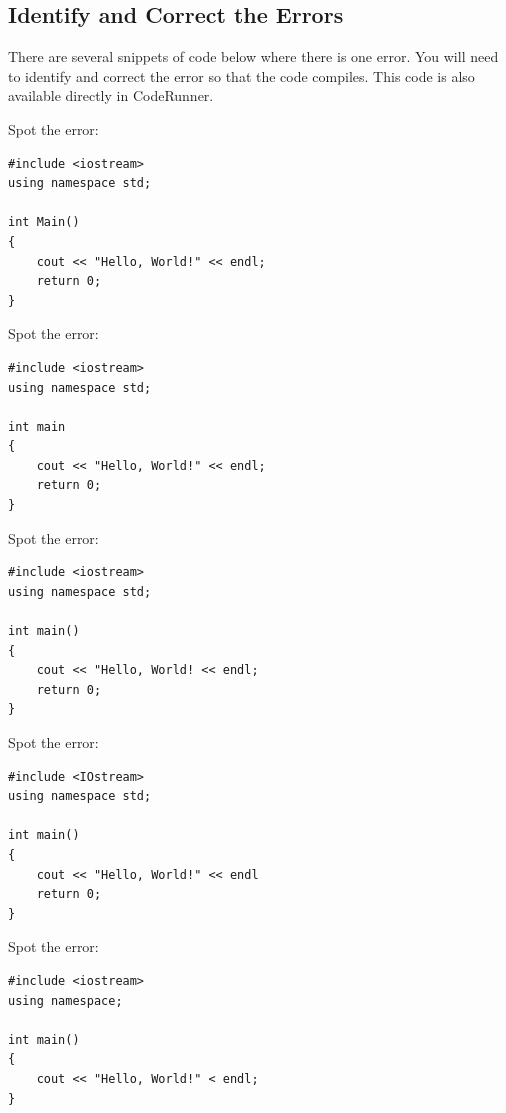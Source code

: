 \subsection{Identify and Correct the Errors}
There are several snippets of code below where there is one error. You will need to identify and correct the error so that the code compiles. This code is also available directly in CodeRunner. 

\begin{multipart}
Spot the error:


    \begin{verbatim}
#include <iostream> 
using namespace std;
						
int Main()
{
	cout << "Hello, World!" << endl;
	return 0; 
}
    \end{verbatim}
\end{multipart}

\begin{multipart}
Spot the error:


    \begin{verbatim}
#include <iostream> 
using namespace std;
						
int main 
{
	cout << "Hello, World!" << endl;
	return 0; 
}
    \end{verbatim}
\end{multipart}

\begin{multipart}
Spot the error:


    \begin{verbatim}
#include <iostream> 
using namespace std;
						
int main() 
{
	cout << "Hello, World! << endl;
	return 0; 
} 
    \end{verbatim}
\end{multipart}

\begin{multipart}
Spot the error:


    \begin{verbatim}
#include <IOstream> 
using namespace std;
						
int main() 
{
	cout << "Hello, World!" << endl
	return 0; 
} 
    \end{verbatim}
\end{multipart}

\begin{multipart}
Spot the error:


    \begin{verbatim}
#include <iostream> 
using namespace;
						
int main() 
{
	cout << "Hello, World!" < endl; 
}
    \end{verbatim}
\end{multipart}
